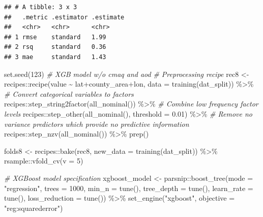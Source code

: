 \documentclass[
]{article}
\newenvironment{Shaded}{\begin{snugshade}}{\end{snugshade}}
\newcommand{\AttributeTok}[1]{\textcolor[rgb]{0.77,0.63,0.00}{#1}}
\newcommand{\CommentTok}[1]{\textcolor[rgb]{0.56,0.35,0.01}{\textit{#1}}}
\newcommand{\DecValTok}[1]{\textcolor[rgb]{0.00,0.00,0.81}{#1}}
\newcommand{\FloatTok}[1]{\textcolor[rgb]{0.00,0.00,0.81}{#1}}
\newcommand{\FunctionTok}[1]{\textcolor[rgb]{0.00,0.00,0.00}{#1}}
\newcommand{\NormalTok}[1]{#1}
\newcommand{\OtherTok}[1]{\textcolor[rgb]{0.56,0.35,0.01}{#1}}
\newcommand{\SpecialCharTok}[1]{\textcolor[rgb]{0.00,0.00,0.00}{#1}}
\newcommand{\StringTok}[1]{\textcolor[rgb]{0.31,0.60,0.02}{#1}}
\begin{document}
\begin{verbatim}
## # A tibble: 3 x 3
##   .metric .estimator .estimate
##   <chr>   <chr>      <chr>    
## 1 rmse    standard   1.99     
## 2 rsq     standard   0.36     
## 3 mae     standard   1.43
\end{verbatim}

\begin{Shaded}
\begin{Highlighting}[]
\FunctionTok{set.seed}\NormalTok{(}\DecValTok{123}\NormalTok{)}
\CommentTok{\# XGB model w/o cmaq and aod}
\CommentTok{\# Preprocessing recipe}
\NormalTok{rec8 }\OtherTok{\textless{}{-}} 
\NormalTok{  recipes}\SpecialCharTok{::}\FunctionTok{recipe}\NormalTok{(value }\SpecialCharTok{\textasciitilde{}}\NormalTok{ lat}\SpecialCharTok{+}\NormalTok{county\_area}\SpecialCharTok{+}\NormalTok{lon, }\AttributeTok{data =} \FunctionTok{training}\NormalTok{(dat\_split)) }\SpecialCharTok{\%\textgreater{}\%}
  \CommentTok{\# Convert categorical variables to factors}
\NormalTok{  recipes}\SpecialCharTok{::}\FunctionTok{step\_string2factor}\NormalTok{(}\FunctionTok{all\_nominal}\NormalTok{()) }\SpecialCharTok{\%\textgreater{}\%}
  \CommentTok{\# Combine low frequency factor levels}
\NormalTok{  recipes}\SpecialCharTok{::}\FunctionTok{step\_other}\NormalTok{(}\FunctionTok{all\_nominal}\NormalTok{(), }\AttributeTok{threshold =} \FloatTok{0.01}\NormalTok{) }\SpecialCharTok{\%\textgreater{}\%}
  \CommentTok{\# Remove no variance predictors which provide no predictive information }
\NormalTok{  recipes}\SpecialCharTok{::}\FunctionTok{step\_nzv}\NormalTok{(}\FunctionTok{all\_nominal}\NormalTok{()) }\SpecialCharTok{\%\textgreater{}\%}
  \FunctionTok{prep}\NormalTok{()}

\NormalTok{folds8 }\OtherTok{\textless{}{-}}\NormalTok{ recipes}\SpecialCharTok{::}\FunctionTok{bake}\NormalTok{(rec8, }\AttributeTok{new\_data =} \FunctionTok{training}\NormalTok{(dat\_split)) }\SpecialCharTok{\%\textgreater{}\%}  
\NormalTok{  rsample}\SpecialCharTok{::}\FunctionTok{vfold\_cv}\NormalTok{(}\AttributeTok{v =} \DecValTok{5}\NormalTok{)}

\CommentTok{\# XGBoost model specification}
\NormalTok{xgboost\_model }\OtherTok{\textless{}{-}}\NormalTok{ parsnip}\SpecialCharTok{::}\FunctionTok{boost\_tree}\NormalTok{(}\AttributeTok{mode =} \StringTok{"regression"}\NormalTok{, }\AttributeTok{trees =} \DecValTok{1000}\NormalTok{, }\AttributeTok{min\_n =} \FunctionTok{tune}\NormalTok{(),}
  \AttributeTok{tree\_depth =} \FunctionTok{tune}\NormalTok{(), }\AttributeTok{learn\_rate =} \FunctionTok{tune}\NormalTok{(), }\AttributeTok{loss\_reduction =} \FunctionTok{tune}\NormalTok{()) }\SpecialCharTok{\%\textgreater{}\%}
  \FunctionTok{set\_engine}\NormalTok{(}\StringTok{"xgboost"}\NormalTok{, }\AttributeTok{objective =} \StringTok{"reg:squarederror"}\NormalTok{)}


\end{Highlighting}
\end{Shaded}
\end{document}
